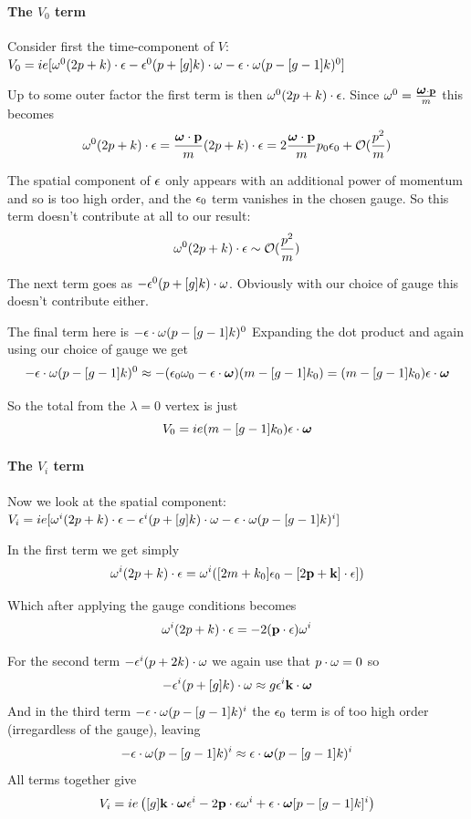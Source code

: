 \paragraph{The $V_0$ term}
Consider first the time-component of $V$: 
$V_0 = ie[\omega^0 (2p + k) \cdot \epsilon - \epsilon^0 (p+[g]k) \cdot \omega - \epsilon \cdot \omega (p-[g-1]k)^0 ]$

Up to some outer factor the first term is then $\omega^0 (2p + k) \cdot \epsilon$.  Since $\omega^0 =\frac{\mbox{\boldmath$ \omega $} \cdot \mathbf{p}}{m}$ this becomes
\[
\omega^0 (2p + k) \cdot \epsilon = \frac{\mbox{\boldmath$ \omega $} \cdot \mathbf{p}}{m} (2p + k) \cdot \epsilon  = 2 \frac{\mbox{\boldmath$ \omega $} \cdot \mathbf{p}}{m} p_0  \epsilon_0 + \mathcal{O}(\frac{p^2}{m})
\]

The spatial component of $\epsilon$ only appears with an additional power of momentum and so is too high order, and the $\epsilon_0$ term vanishes in the chosen gauge.  So this term doesn't contribute at all to our result:
\[
\omega^0 (2p + k) \cdot \epsilon \sim \mathcal{O}(\frac{p^2}{m})
\]

The next term goes as $ -\epsilon^0 (p+[g]k) \cdot \omega$.   Obviously with our choice of gauge this doesn't contribute either.

The final term here is $- \epsilon \cdot \omega (p-[g-1]k)^0 $  Expanding the dot product and again using our choice of gauge we get
\[
	- \epsilon \cdot \omega (p-[g-1]k)^0   \approx - (\epsilon_0 \omega_0  - \mathbf{\epsilon} \cdot \mbox{\boldmath$ \omega $} ) (m - [g-1]k_0) = (m-[g-1]k_0)\mathbf{\epsilon} \cdot \mbox{\boldmath$ \omega $}
\]

So the total from the $\lambda=0$ vertex is just 
\[
	V_0 = ie(m-[g-1]k_0)\mathbf{\epsilon} \cdot \mbox{\boldmath$ \omega $}
\]

\paragraph{The $V_i$ term}
Now we look at the spatial component: $V_i = ie[\omega^i (2p + k) \cdot \epsilon - \epsilon^i (p+[g]k) \cdot \omega - \epsilon \cdot \omega (p-[g-1]k)^i ]$

In the first term we get simply
\[
	\omega^i (2p + k) \cdot \epsilon = \omega^i ([2m + k_0]\epsilon_0 - [2\mathbf{p} + \mathbf{k}] \cdot \mathbf{\epsilon} ]) 
\]

Which after applying the gauge conditions becomes
\[
	\omega^i (2p + k) \cdot \epsilon =  - 2 (\mathbf{p} \cdot \mathbf{\epsilon} ) \omega^i 
\]

For the second term $- \epsilon^i (p+2k) \cdot \omega$ we again use that $p \cdot \omega=0$ so 
\[
	- \epsilon^i (p+[g]k) \cdot \omega \approx g \epsilon^i \mathbf{k} \cdot \mbox{\boldmath$ \omega $} 
\]
And in the third term $ - \epsilon \cdot \omega (p-[g-1]k)^i$ the $\epsilon_0$ term is of too high order (irregardless of the gauge), leaving
\[
	- \epsilon \cdot \omega (p-[g-1]k)^i \approx \mathbf{\epsilon} \cdot \mbox{\boldmath$ \omega $} (p-[g-1]k)^i
\]	
All terms together give
\[
V_i = ie\left( [g]\mathbf{k} \cdot \mbox{\boldmath$ \omega $} \epsilon^i - 2\mathbf{p} \cdot \mathbf{\epsilon} \omega^i + \mathbf{\epsilon} \cdot \mbox{\boldmath$ \omega $} [p - [g-1]k]^i \right )
\]

